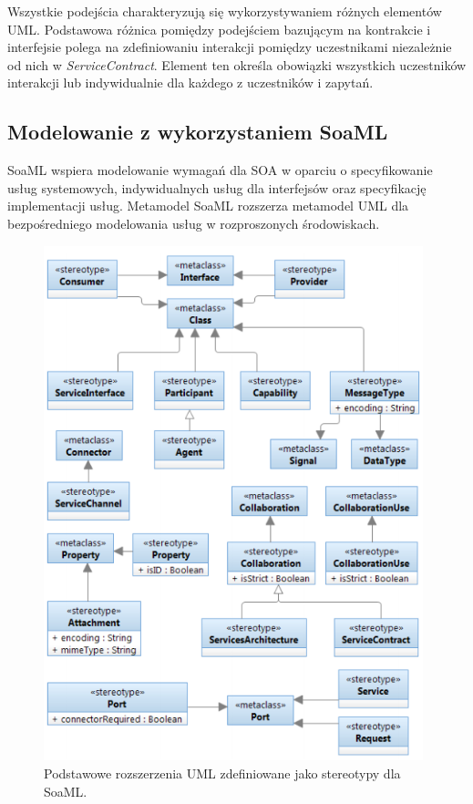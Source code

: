 Wszystkie podejścia charakteryzują się wykorzystywaniem różnych elementów UML. Podstawowa różnica pomiędzy podejściem bazującym na kontrakcie i interfejsie polega na zdefiniowaniu interakcji pomiędzy uczestnikami niezależnie od nich w \emph{ServiceContract}. Element ten określa obowiązki wszystkich uczestników interakcji lub indywidualnie dla każdego z uczestników i zapytań. 

\subsection{Modelowanie z wykorzystaniem SoaML}
SoaML wspiera modelowanie wymagań dla SOA w oparciu o specyfikowanie usług systemowych, indywidualnych usług dla interfejsów oraz specyfikację implementacji usług. Metamodel SoaML\cite{soaml_metamodel} rozszerza metamodel UML dla bezpośredniego modelowania usług w rozproszonych środowiskach. \cite{SoaMLErvBase}

\begin{figure}[h!tbp]
\begin{centering}
\includegraphics[width=11cm]{img/soaml_metamodel.png}
\caption[Podstawowe rozszerzenia UML zdefiniowane jako stereotypy dla SoaML.]{Podstawowe rozszerzenia UML zdefiniowane jako stereotypy dla SoaML. \cite{SoaMLErvBase}}\label{soaml_metamodel}
\end{centering}
\end{figure}

